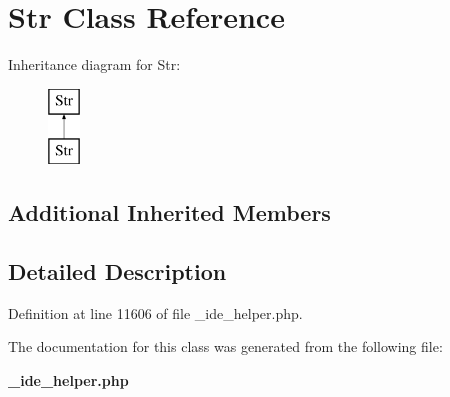 \section{Str Class Reference}
\label{class_str}
Inheritance diagram for Str\+:\begin{figure}[H]
\begin{center}
\leavevmode
\includegraphics[height=2.000000cm]{class_str}
\end{center}
\end{figure}
\subsection*{Additional Inherited Members}


\subsection{Detailed Description}


Definition at line 11606 of file \+\_\+ide\+\_\+helper.\+php.



The documentation for this class was generated from the following file\+:\begin{DoxyCompactItemize}
\item 
{\bf \+\_\+ide\+\_\+helper.\+php}\end{DoxyCompactItemize}
